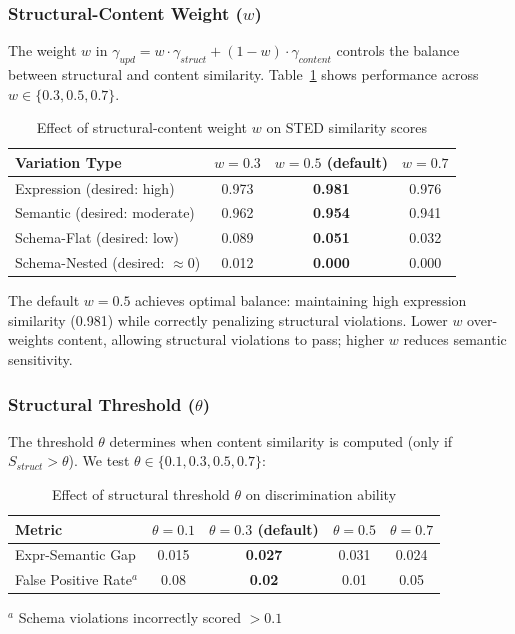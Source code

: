 \documentclass{article}
\begin{document}
\subsubsection{Structural-Content Weight ($w$)}
The weight $w$ in $\gamma_{upd} = w \cdot \gamma_{struct} + (1-w) \cdot \gamma_{content}$ controls the balance between structural and content similarity. Table~\ref{tab:ablation-w} shows performance across $w \in \{0.3, 0.5, 0.7\}$.

\begin{table}[h]
\vspace{-2mm}
\centering
\caption{Effect of structural-content weight $w$ on STED similarity scores}
\label{tab:ablation-w}
\small
\begin{tabular}{lccc}
\toprule
\textbf{Variation Type} & $w=0.3$ & $w=0.5$ (default) & $w=0.7$ \\
\midrule
Expression (desired: high) & 0.973 & \textbf{0.981} & 0.976 \\
Semantic (desired: moderate) & 0.962 & \textbf{0.954} & 0.941 \\
Schema-Flat (desired: low) & 0.089 & \textbf{0.051} & 0.032 \\
Schema-Nested (desired: $\approx$0) & 0.012 & \textbf{0.000} & 0.000 \\
\bottomrule
\end{tabular}
\vspace{-2mm}
\end{table}

The default $w=0.5$ achieves optimal balance: maintaining high expression similarity (0.981) while correctly penalizing structural violations. Lower $w$ over-weights content, allowing structural violations to pass; higher $w$ reduces semantic sensitivity.

\subsubsection{Structural Threshold ($\theta$)}
The threshold $\theta$ determines when content similarity is computed (only if $S_{struct} > \theta$). We test $\theta \in \{0.1, 0.3, 0.5, 0.7\}$:

\begin{table}[h]
\vspace{-2mm}
\centering
\caption{Effect of structural threshold $\theta$ on discrimination ability}
\label{tab:ablation-theta}
\small
\begin{tabular}{lcccc}
\toprule
\textbf{Metric} & $\theta=0.1$ & $\theta=0.3$ (default) & $\theta=0.5$ & $\theta=0.7$ \\
\midrule
Expr-Semantic Gap & 0.015 & \textbf{0.027} & 0.031 & 0.024 \\
False Positive Rate$^a$ & 0.08 & \textbf{0.02} & 0.01 & 0.05 \\
\bottomrule
\end{tabular}
\vspace{0.3em}
\small{$^a$ Schema violations incorrectly scored $>0.1$}
\vspace{-2mm}
\end{table}
\end{document}
